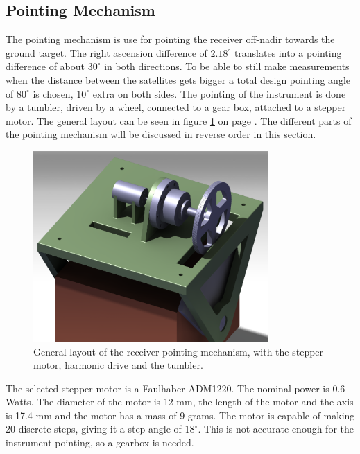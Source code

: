 \subsection{Pointing Mechanism}
\label{ss:recDDpoint}
The pointing mechanism is use for pointing the receiver off-nadir towards the ground target. The right ascension difference of $2.18^\circ$ translates into a pointing difference of about $30^\circ$ in both directions. To be able to still make measurements when the distance between the satellites gets bigger a total design pointing angle of $80^\circ$ is chosen, $10^\circ$ extra on both sides. The pointing of the instrument is done by a tumbler, driven by a wheel, connected to a gear box, attached to a stepper motor. The general layout can be seen in figure \ref{fig:point} on page \pageref{fig:point}. The different parts of the pointing mechanism will be discussed in reverse order in this section.

\begin{figure} [h]
\centering
\includegraphics[width=0.8\textwidth]{chapters/img/point_setup.png}
\caption[General layout of the receiver pointing mechanism]{General layout of the receiver pointing mechanism, with the stepper motor, harmonic drive and the tumbler.}
\label{fig:point}
\end{figure}

The selected stepper motor is a Faulhaber ADM1220. The nominal power is 0.6 Watts. The diameter of the motor is 12 mm, the length of the motor and the axis is 17.4 mm and the motor has a mass of 9 grams. The motor is capable of making 20 discrete steps, giving it a step angle of $18^\circ$. This is not accurate enough for the instrument pointing, so a gearbox is needed.

